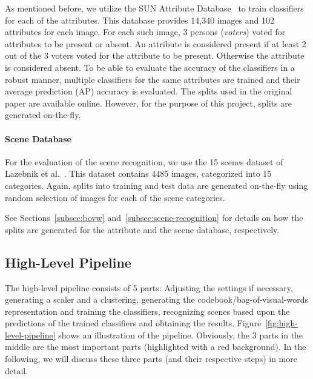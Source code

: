\documentclass{vldb}
\begin{document}
As mentioned before, we utilize the SUN Attribute Database~\cite{Patterson:2012}
to train classifiers for each of the attributes. This database provides 14,340
images and 102 attributes for each image. For each such image, 3 persons
(\emph{voters}) voted for attributes to be present or absent. An attribute is
considered present if at least 2 out of the 3 voters voted for the attribute to
be present. Otherwise the attribute is considered absent. To be able to evaluate
the accuracy of the classifiers in a robust manner, multiple classifiers for the
same attributes are trained and their average prediction (AP) accuracy is evaluated.
The splits used in the original paper are available online. However, for the
purpose of this project, splits are generated on-the-fly.

\paragraph*{Scene Database}
\label{par:scene-database}

For the evaluation of the scene recognition, we use the 15 scenes dataset of
Lazebnik et al.~\cite{Lazebnik:2006}. This dataset contains 4485 images,
categorized into 15 categories. Again, splits into training and test data are
generated on-the-fly using random selection of images for each of the scene
categories. 

See Sections~\ref{subsec:bovw} and~\ref{subsec:scene-recognition} for details on
how the splits are generated for the attribute and the scene database,
respectively.

\clearpage

\subsection{High-Level Pipeline}
\label{subsec:high-level-pipeline}

The high-level pipeline consists of 5 parts: Adjusting the settings if necessary,
generating a scaler and a clustering, generating the codebook/bag-of-visual-words
representation and training the classifiers, recognizing scenes based upon the
predictions of the trained classifiers and obtaining the results.
Figure~\ref{fig:high-level-pipeline} shows an illustration of the pipeline.
Obviously, the 3 parts in the middle are the most important parts (highlighted
with a red background). In the following, we will discuss these three parts (and
their respective steps) in more detail.
\end{document}
